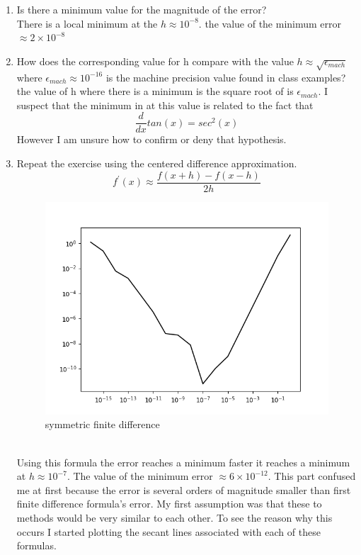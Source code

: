 \documentclass{article}
\begin{document}
    \begin{enumerate}
        \item Is there a minimum value for the magnitude of the error?
        \\ There is a local minimum at the $ h \approx 10^{-8} $.   the value of the minimum error $\approx 2 \times 10^{-8}$
        \item How does the corresponding value for h compare with the value $ h \approx \sqrt{\epsilon_{mach}}$ where $\epsilon_{mach} \approx 10^{-16}$ is the machine precision value found in class examples? \\
        the value of h where there is a minimum is the square root of is $\epsilon_{mach}$. I suspect that the minimum in at this value is related to the fact that $$\frac{d}{dx}tan(x)=sec^{2}(x)$$ However I am unsure how to confirm or deny that hypothesis.  
        \item Repeat the exercise using the centered difference approximation.
        $$ f^{\prime}(x) \approx \frac{f(x+h)-f(x-h)}{2h}$$
        \pagebreak
        \begin{figure}[hbt!]
        	\centering
        	\includegraphics[width=.75\linewidth]{finite_diff2png.png}
        	\caption{ symmetric finite difference}
        	\label{fig: symmetric finite diffrence}
    	\end{figure}
        \\ Using this formula the error reaches a minimum faster it reaches a minimum at $ h \approx 10^{-7} $. The value of the minimum error $\approx 6 \times 10^{-12} $. This part confused me at first because the error is several orders of magnitude smaller than first finite difference formula's error. My first assumption was that these to methods would be very similar to each other. To see the reason why this occurs I started plotting the secant lines associated with each of these formulas.

\end{enumerate}
\end{document}
